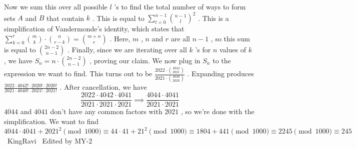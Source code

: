 \documentclass[12pt]{article}
\begin{document}
Now we sum this over all possible $l$ 's to find the total number of ways to form sets $A$ and $B$ that contain $k$ . This is equal to $\sum_{l=0}^{n-1} \binom{n-1}{l}^2$ . This is a simplification of Vandermonde's identity, which states that $\sum_{k=0}^{r} \binom{m}{k} \cdot \binom{n}{r-k} = \binom{m+n}{r}$ . Here, $m$ , $n$ and $r$ are all $n-1$ , so this sum is equal to $\binom{2n-2}{n-1}$ . Finally, since we are iterating over all $k$ 's for $n$ values of $k$ , we have $S_n = n \cdot \binom{2n-2}{n-1}$ , proving our claim. We now plug in $S_n$ to the expression we want to find. This turns out to be $\frac{2022 \cdot \binom{4042}{2021}}{2021 \cdot \binom{4040}{2020}}$ . Expanding produces $\frac{2022 \cdot 4042!\cdot 2020! \cdot 2020!}{2021 \cdot 4040! \cdot 2021! \cdot 2021!}$ . After cancellation, we have \[\frac{2022 \cdot 4042 \cdot 4041}{2021 \cdot 2021 \cdot 2021} \implies \frac{4044\cdot 4041}{2021 \cdot 2021}\] $4044$ and $4041$ don't have any common factors with $2021$ , so we're done with the simplification. We want to find $4044 \cdot 4041 + 2021^2 \pmod{1000} \equiv 44 \cdot 41 + 21^2 \pmod{1000} \equiv 1804+441 \pmod{1000} \equiv 2245 \pmod{1000} \equiv \boxed{245}$ ~KingRavi
~Edited by MY-2
\end{document}
